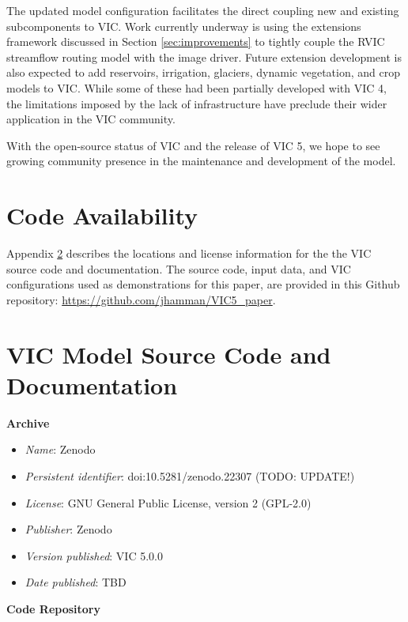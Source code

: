 \documentclass[gmd, manuscript]{copernicus}
\begin{document}
  The updated model configuration facilitates the direct coupling new and existing subcomponents to VIC.
  Work currently underway is using the extensions framework discussed in Section \ref{sec:improvements} to tightly couple the RVIC streamflow routing model with the image driver.
  Future extension development is also expected to add reservoirs, irrigation, glaciers, dynamic vegetation, and crop models to VIC.
  While some of these had been partially developed with VIC 4, the limitations imposed by the lack of infrastructure have preclude their wider application in the VIC community.

  With the open-source status of VIC and the release of VIC 5, we hope to see growing community presence in the maintenance and development of the model.

\section{Code Availability}
\label{appendix:code_avail}

  Appendix \ref{appendix:source_code} describes the locations and license information for the the VIC source code and documentation.
  The source code, input data, and VIC configurations used as demonstrations for this paper, are provided in this Github repository: \url{https://github.com/jhamman/VIC5_paper}.

\appendix
\section{VIC Model Source Code and Documentation}
\label{appendix:source_code}
{\bf Archive}

\begin{itemize}
	\item \textit{Name}: Zenodo
	\item \textit{Persistent identifier}: doi:10.5281/zenodo.22307 (TODO: UPDATE!)
	\item \textit{License}: GNU General Public License, version 2 (GPL-2.0)
	\item \textit{Publisher}:  Zenodo
	\item \textit{Version published}: VIC 5.0.0
	\item \textit{Date published}: TBD
\end{itemize}

{\bf Code Repository}

\begin{itemize}
	\item \textit{Name}: GitHub
	\item \textit{Identifier}: \url{https://github.com/UW-Hydro/VIC/}}
	\item \textit{License}: GNU General Public License, version 2 (GPL-2.0)
	\item \textit{Date published}: TBD
\end{itemize}
\end{document}
